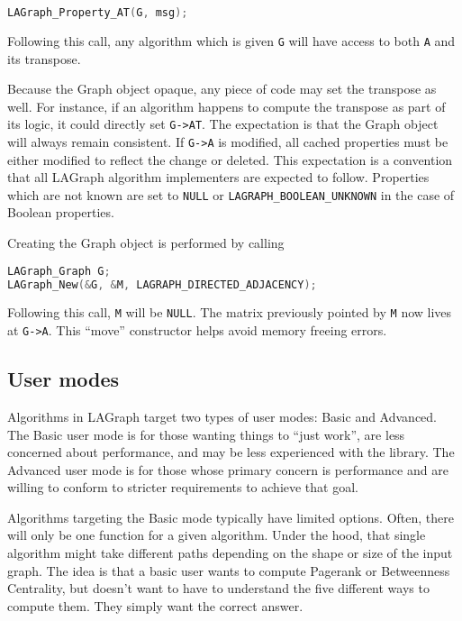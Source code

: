 \begin{lstlisting}[language=C, label=lst:propertyat, caption=Utility to compute the transpose]
LAGraph_Property_AT(G, msg);
\end{lstlisting}

Following this call, any algorithm which is given \verb'G' will have access to both \verb'A' and its transpose.

Because the Graph object opaque, any piece of code may set the transpose as well. For instance, if an algorithm happens
to compute the transpose as part of its logic, it could directly set \verb'G->AT'. The expectation is that the Graph object
will always remain consistent. If \verb'G->A' is modified, all cached properties must be either modified to reflect the change
or deleted. This expectation is a convention that all LAGraph algorithm implementers are expected to follow.
Properties which are not known are set to \verb'NULL' or \verb'LAGRAPH_BOOLEAN_UNKNOWN' in the case of Boolean properties.

Creating the Graph object is performed by calling

\begin{lstlisting}[language=C, label=lst:lagraphnew, caption=Constructing an LAGraph_Graph object]
LAGraph_Graph G;
LAGraph_New(&G, &M, LAGRAPH_DIRECTED_ADJACENCY);
\end{lstlisting}

Following this call, \verb'M' will be \verb'NULL'. The matrix previously pointed by \verb'M' now lives at \verb'G->A'.
This ``move'' constructor helps avoid memory freeing errors.


\subsection{User modes}

Algorithms in LAGraph target two types of user modes: Basic and Advanced. The Basic user mode is for those wanting
things to ``just work'', are less concerned about performance, and may be less experienced with the library.
The Advanced user mode is for those whose primary concern is performance and are willing to conform to stricter
requirements to achieve that goal.

Algorithms targeting the Basic mode typically have limited options. Often, there will only be one function for
a given algorithm. Under the hood, that single algorithm might take different paths depending on the shape or
size of the input graph. The idea is that a basic user wants to compute Pagerank or Betweenness Centrality,
but doesn't want to have to understand the five different ways to compute them. They simply want the correct answer.

